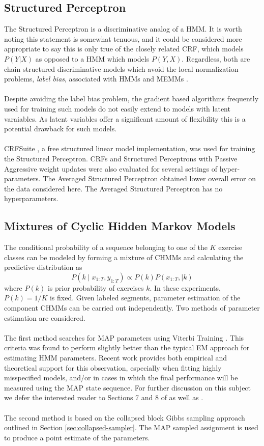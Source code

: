\documentclass[12pt]{report}
\newcommand{\1}[0]{\mathbbm{1}}
\newcommand{\seq}[3]{\ensuremath{#1_{{#2}:{#3}}}}
\begin{document}
\subsection{Structured Perceptron}
The Structured Perceptron is a discriminative analog of a \ac{HMM}. 
It is worth noting this statement is somewhat tenuous, and it could 
be considered more appropriate to say this is only true of the closely 
related \ac{CRF}, which models $P(Y|X)$ as opposed to a \ac{HMM} 
which models $P(Y,X)$. Regardless, both are chain structured discriminative 
models which avoid the local normalization problems, \emph{label bias}, associated 
with \acp{HMM} and \acp{MEMM} \cite{lafferty-crf}. 
\\\\
Despite avoiding the label bias problem, the gradient based algorithms frequently
used for training such models do not easily extend to models with latent varaiables. 
As latent variables offer a significant amount of flexibility this is a potential
drawback for such models.
\\\\
CRFSuite \cite{CRFsuite}, a free structured linear model implementation, was used
for training the Structured Perceptron. \acp{CRF} and Structured Perceptrons
with Passive Aggressive weight updates were also evaluated for several settings of
hyper-parameters. The Averaged Structured Perceptron obtained lower overall 
error on the data considered here. The Averaged Structured Perceptron has no hyperparameters.

\subsection{Mixtures of Cyclic Hidden Markov Models}
The conditional probability of a sequence belonging to one of the 
$K$ exercise classes can be modeled by forming a mixture of \acp{CHMM} 
and calculating the predictive distribution as
\[
    P(k \mid \seq{x}{1}{T}, \seq{y}{1}{T}) \propto P(k)P(\seq{x}{1}{T}, \mid k)
\]
where $P(k)$ is prior probability of exercises $k$. 
In these experiments, $P(k) = 1 / K$ is fixed. Given labeled segments,
parameter estimation of the component \acp{CHMM} can be carried
out independently. Two methods of parameter estimation are considered. 
\\\\
The first method searches for \ac{MAP} parameters using Viterbi Training 
\cite{segmental-kmeans}. This criteria was found to perform slightly better than the 
typical \ac{EM} approach for estimating \ac{HMM} parameters. Recent work 
provides both empirical and theoretical support for this observation, especially when fitting 
highly misspecified models, and/or in cases in which the final performance will be measured using 
the MAP state sequence. For further discussion on this subject we defer the interested reader 
to Sections 7 and 8 of \cite{viterbi-em} as well as \cite{estimate-wrong}.
\\\\
The second method is based on the collapsed block Gibbs sampling approach outlined in Section
\ref{sec:collapsed-sampler}. The MAP sampled assignment is used to produce a point estimate of the parameters.
\end{document}
